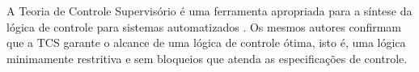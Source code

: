 







A Teoria de Controle Supervis\'orio \'e uma ferramenta apropriada para a s\'intese da l\'ogica de controle para sistemas automatizados \cite{leal2009}. Os mesmos autores confirmam que a TCS garante o alcance de uma l\'ogica de controle \'otima, isto \'e, uma l\'ogica minimamente restritiva e sem bloqueios que atenda as especifica\c{c}\~oes de controle.

